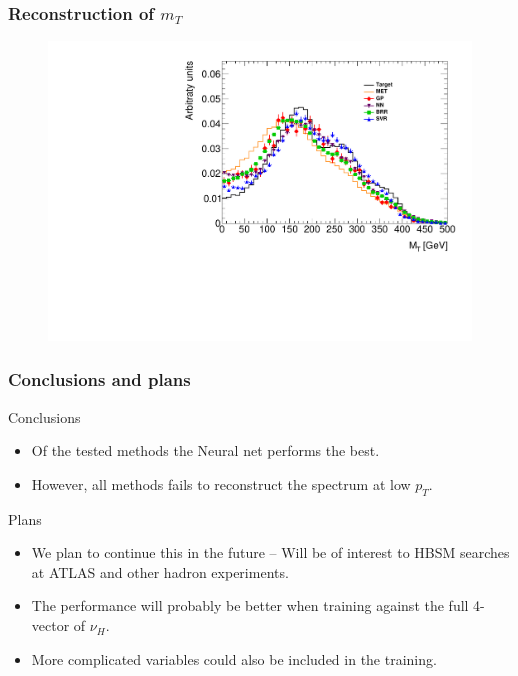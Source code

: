 \documentclass[9pt, lualatex]{beamer}
\begin{document}
\begin{frame}
    \frametitle{Reconstruction of $m_T$}

    \begin{figure}
        \centering
        \includegraphics[width=.7\textwidth]{plots/mt.pdf}
    \end{figure}
\end{frame}

\begin{frame}
    \frametitle{Conclusions and plans}

    Conclusions
    \begin{itemize}
        \item Of the tested methods the Neural net performs the best.
        \item However, all methods fails to reconstruct the spectrum at low $p_T$.
    \end{itemize}

    \vfill

    Plans
    \begin{itemize}
        \item We plan to continue this in the future -- Will be of interest to HBSM searches at ATLAS and other hadron experiments.
        \item The performance will probably be better when training against the full 4-vector of $\nu_H$.
        \item More complicated variables could also be included in the training.
    \end{itemize}
\end{frame}
\end{document}
